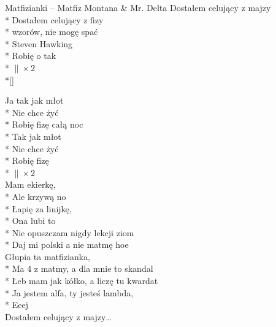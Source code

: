 \begin{piosenka_dluga}{Matfizianki -- Matfiz Montana \& Mr. Delta}
 Dostałem celujący z majzy \\*
 Dostałem celujący z fizy \\*
 wzorów, nie mogę spać \\*
 Steven Hawking \\*
 Robię o tak \\*
 $\| \times 2$ \\*[\zwrotkaspace]

 Ja tak jak młot \\*
 Nie chce żyć \\*
 Robię fizę całą noc \\*
 Tak jak młot \\*
 Nie chce żyć \\*
 Robię fizę \\*
 $\| \times 2$ \\[\zwrotkaspace]

Mam ekierkę, \\*
Ale krzywą no \\*
Łapię za linijkę, \\*
Ona lubi to \\*
Nie opuszczam nigdy lekcji ziom \\*
Daj mi polski a nie matmę hoe \\[\zwrotkaspace]

Głupia ta matfizianka, \\*
Ma 4 z matmy, a dla mnie to skandal \\*
Łeb mam jak kółko, a liczę tu kwardat \\*
Ja jestem alfa, ty jesteś lambda, \\*
Eeej \\[\zwrotkaspace]

 Dostałem celujący z majzy\ldots \\[\zwrotkaspace]

\end{piosenka_dluga}